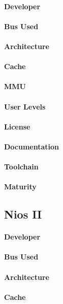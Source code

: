 \documentclass[11pt]{article} %
\begin{document}
\paragraph{Developer} 
\paragraph{Bus Used} 
\paragraph{Architecture} 
\paragraph{Cache} 
\paragraph{MMU} 
\paragraph{User Levels} 
\paragraph{License} 
\paragraph{Documentation} 
\paragraph{Toolchain} 
\paragraph{Maturity} 

\subsection{Nios II}
\paragraph{Developer} 
\paragraph{Bus Used} 
\paragraph{Architecture} 
\paragraph{Cache} 
\end{document}
